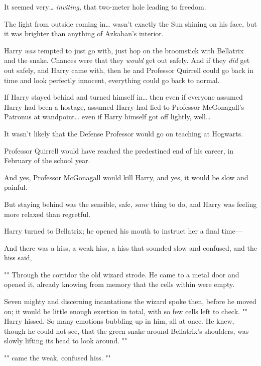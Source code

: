 It seemed very{\ldots} \emph{inviting,} that two-meter hole leading to freedom.

The light from outside coming in{\ldots} wasn't exactly the Sun shining on his 
face, but it was brighter than anything of Azkaban's interior.

Harry \emph{was} tempted to just go with, just hop on the broomstick with 
Bellatrix and the snake. Chances were that they \emph{would} get out safely. 
And if they \emph{did} get out safely, and Harry came with, then he and 
Professor Quirrell could go back in time and look perfectly innocent, 
everything could go back to normal.

If Harry stayed behind and turned himself in{\ldots} then even if everyone 
assumed Harry had been a hostage, assumed Harry had lied to Professor 
McGonagall's Patronus at wandpoint{\ldots} even if Harry himself got off 
lightly, well{\ldots}

It wasn't likely that the Defense Professor would go on teaching at Hogwarts.

Professor Quirrell would have reached the predestined end of his career, in 
February of the school year.

And yes, Professor McGonagall would kill Harry, and yes, it would be slow and 
painful.

But staying behind was the sensible, safe, \emph{sane} thing to do, and Harry 
was feeling more relaxed than regretful.

Harry turned to Bellatrix; he opened his mouth to instruct her a final time---

And there was a hiss, a weak hiss, a hiss that sounded slow and confused, and 
the hiss said,

""
\sbreak
Through the corridor the old wizard strode. He came to a metal door and opened 
it, already knowing from memory that the cells within were empty.

Seven mighty and discerning incantations the wizard spoke then, before he moved 
on; it would be little enough exertion in total, with so few cells left to 
check.
\sbreak
"" Harry hissed. So many emotions bubbling up in him, all at 
once. He knew, though he could not see, that the green snake around Bellatrix's 
shoulders, was slowly lifting its head to look around. ""

"" came the weak, confused hiss. ""

